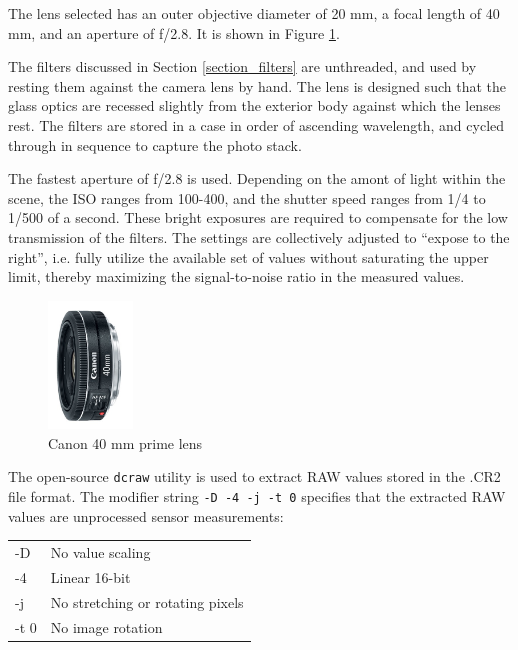 \documentclass[twocolumn,10pt]{asme2ej}
\newcommand{\id}{\hspace{6 mm}}
\begin{document}
\id The lens selected has an outer objective diameter of 20 mm, a focal length of 40 mm, and an aperture of f/2.8. It is shown in Figure \ref{canon_40_mm_prime_lens}.

\id The filters discussed in Section \ref{section_filters} are unthreaded, and used by resting them against the camera lens by hand. The lens is designed such that the glass optics are recessed slightly from the exterior body against which the lenses rest. The filters are stored in a case in order of ascending wavelength, and cycled through in sequence to capture the photo stack.

\id The fastest aperture of f/2.8 is used. Depending on the amont of light within the scene, the ISO ranges from 100-400, and the shutter speed ranges from 1/4 to 1/500 of a second. These bright exposures are required to compensate for the low transmission of the filters. The settings are collectively adjusted to ``expose to the right'', i.e. fully utilize the available set of values without saturating the upper limit, thereby maximizing the signal-to-noise ratio in the measured values.

\begin{figure}
\centering
\includegraphics[width=0.2\textwidth]{canon_40_mm_prime_lens.jpg}
\caption{Canon 40 mm prime lens}
\label{canon_40_mm_prime_lens}
\end{figure}

The open-source \texttt{dcraw} utility is used to extract RAW values stored in the .CR2 file format. The modifier string \texttt{-D -4 -j -t 0} specifies that the extracted RAW values are unprocessed sensor measurements:\\

\begin{tabular}{l | l}
-D & No value scaling \\
-4 & Linear 16-bit \\
-j & No stretching or rotating pixels \\
-t 0 & No image rotation \\
\end{tabular} \\
\end{document}

